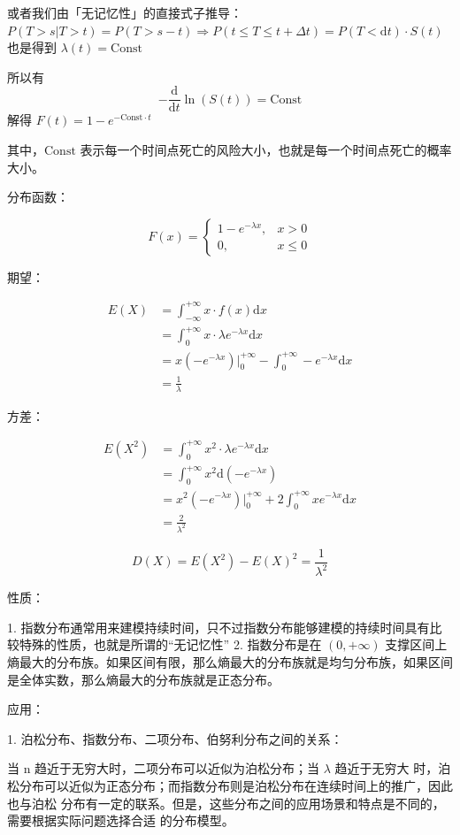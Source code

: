 \documentclass[12pt, a4paper, oneside]{ctexbook}
\begin{document}
或者我们由「无记忆性」的直接式子推导：$P(T > s | T > t) = P(T > s - t) \Rightarrow P(t \leq T \leq t + \Delta t) = P(T < \mathrm{d}t) \cdot S(t)$ 也是得到 $\lambda(t) = \text{Const}$

所以有
$$
-\dfrac{\mathrm{d}}{\mathrm{d}t}\ln(S(t)) = \text{Const}
$$
解得 $F(t) = 1 - e^{-\text{Const} \cdot t}$

其中，$\text{Const}$ 表示每一个时间点死亡的风险大小，也就是每一个时间点死亡的概率大小。

 分布函数：

$$
F(x) = \begin{cases}
1 - e^{-\lambda x}, &x > 0 \\
0, &x \leq 0
\end{cases}
$$

 期望：

$$
\begin{aligned}
E(X) &= \int_{-\infty}^{+\infty} x \cdot f(x) \mathrm{d}x \\
&= \int_0^{+\infty} x \cdot \lambda e^{-\lambda x} \mathrm{d}x \\
&= x(-e^{-\lambda x})|_{0}^{+\infty} - \int_{0}^{+\infty} -e^{-\lambda x} \mathrm{d}x \\
&= \frac{1}{\lambda}
\end{aligned}
$$

 方差：

$$
\begin{aligned}
E(X^{2}) &= \int_0^{+\infty} x^{2} \cdot \lambda e^{-\lambda x} \mathrm{d}x \\
&= \int_0^{+\infty} x^{2} \mathrm{d}(-e^{-\lambda x}) \\
&= x^{2}(-e^{-\lambda x})|_{0}^{+\infty} + 2\int_0^{+\infty}xe^{-\lambda x} \mathrm{d}x \\
&= \frac{2}{\lambda^{2}}
\end{aligned}
$$

$$
D(X) = E(X^{2}) - E(X)^{2} = \frac{1}{\lambda^{2}}
$$

 性质：

1. 指数分布通常用来建模持续时间，只不过指数分布能够建模的持续时间具有比较特殊的性质，也就是所谓的“无记忆性”
2. 指数分布是在 $(0, +\infty)$ 支撑区间上熵最大的分布族。如果区间有限，那么熵最大的分布族就是均匀分布族，如果区间是全体实数，那么熵最大的分布族就是正态分布。

 应用：

1. 泊松分布、指数分布、二项分布、伯努利分布之间的关系：

   当 n 趋近于无穷大时，二项分布可以近似为泊松分布；当 $\lambda$ 趋近于无穷大
   时，泊松分布可以近似为正态分布；而指数分布则是泊松分布在连续时间上的推广，因此也与泊松
   分布有一定的联系。但是，这些分布之间的应用场景和特点是不同的，需要根据实际问题选择合适
   的分布模型。
\end{document}
